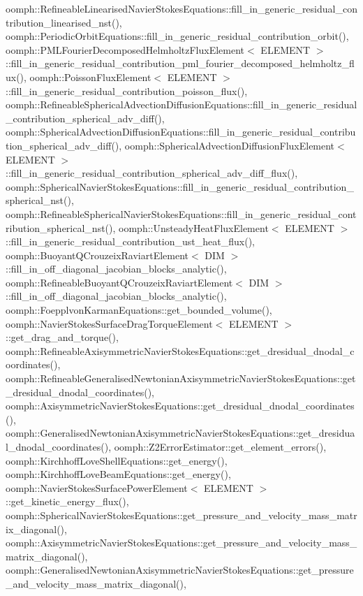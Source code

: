 oomph\+::\+Refineable\+Linearised\+Navier\+Stokes\+Equations\+::fill\+\_\+in\+\_\+generic\+\_\+residual\+\_\+contribution\+\_\+linearised\+\_\+nst(), oomph\+::\+Periodic\+Orbit\+Equations\+::fill\+\_\+in\+\_\+generic\+\_\+residual\+\_\+contribution\+\_\+orbit(), oomph\+::\+P\+M\+L\+Fourier\+Decomposed\+Helmholtz\+Flux\+Element$<$ E\+L\+E\+M\+E\+N\+T $>$\+::fill\+\_\+in\+\_\+generic\+\_\+residual\+\_\+contribution\+\_\+pml\+\_\+fourier\+\_\+decomposed\+\_\+helmholtz\+\_\+flux(), oomph\+::\+Poisson\+Flux\+Element$<$ E\+L\+E\+M\+E\+N\+T $>$\+::fill\+\_\+in\+\_\+generic\+\_\+residual\+\_\+contribution\+\_\+poisson\+\_\+flux(), oomph\+::\+Refineable\+Spherical\+Advection\+Diffusion\+Equations\+::fill\+\_\+in\+\_\+generic\+\_\+residual\+\_\+contribution\+\_\+spherical\+\_\+adv\+\_\+diff(), oomph\+::\+Spherical\+Advection\+Diffusion\+Equations\+::fill\+\_\+in\+\_\+generic\+\_\+residual\+\_\+contribution\+\_\+spherical\+\_\+adv\+\_\+diff(), oomph\+::\+Spherical\+Advection\+Diffusion\+Flux\+Element$<$ E\+L\+E\+M\+E\+N\+T $>$\+::fill\+\_\+in\+\_\+generic\+\_\+residual\+\_\+contribution\+\_\+spherical\+\_\+adv\+\_\+diff\+\_\+flux(), oomph\+::\+Spherical\+Navier\+Stokes\+Equations\+::fill\+\_\+in\+\_\+generic\+\_\+residual\+\_\+contribution\+\_\+spherical\+\_\+nst(), oomph\+::\+Refineable\+Spherical\+Navier\+Stokes\+Equations\+::fill\+\_\+in\+\_\+generic\+\_\+residual\+\_\+contribution\+\_\+spherical\+\_\+nst(), oomph\+::\+Unsteady\+Heat\+Flux\+Element$<$ E\+L\+E\+M\+E\+N\+T $>$\+::fill\+\_\+in\+\_\+generic\+\_\+residual\+\_\+contribution\+\_\+ust\+\_\+heat\+\_\+flux(), oomph\+::\+Buoyant\+Q\+Crouzeix\+Raviart\+Element$<$ D\+I\+M $>$\+::fill\+\_\+in\+\_\+off\+\_\+diagonal\+\_\+jacobian\+\_\+blocks\+\_\+analytic(), oomph\+::\+Refineable\+Buoyant\+Q\+Crouzeix\+Raviart\+Element$<$ D\+I\+M $>$\+::fill\+\_\+in\+\_\+off\+\_\+diagonal\+\_\+jacobian\+\_\+blocks\+\_\+analytic(), oomph\+::\+Foepplvon\+Karman\+Equations\+::get\+\_\+bounded\+\_\+volume(), oomph\+::\+Navier\+Stokes\+Surface\+Drag\+Torque\+Element$<$ E\+L\+E\+M\+E\+N\+T $>$\+::get\+\_\+drag\+\_\+and\+\_\+torque(), oomph\+::\+Refineable\+Axisymmetric\+Navier\+Stokes\+Equations\+::get\+\_\+dresidual\+\_\+dnodal\+\_\+coordinates(), oomph\+::\+Refineable\+Generalised\+Newtonian\+Axisymmetric\+Navier\+Stokes\+Equations\+::get\+\_\+dresidual\+\_\+dnodal\+\_\+coordinates(), oomph\+::\+Axisymmetric\+Navier\+Stokes\+Equations\+::get\+\_\+dresidual\+\_\+dnodal\+\_\+coordinates(), oomph\+::\+Generalised\+Newtonian\+Axisymmetric\+Navier\+Stokes\+Equations\+::get\+\_\+dresidual\+\_\+dnodal\+\_\+coordinates(), oomph\+::\+Z2\+Error\+Estimator\+::get\+\_\+element\+\_\+errors(), oomph\+::\+Kirchhoff\+Love\+Shell\+Equations\+::get\+\_\+energy(), oomph\+::\+Kirchhoff\+Love\+Beam\+Equations\+::get\+\_\+energy(), oomph\+::\+Navier\+Stokes\+Surface\+Power\+Element$<$ E\+L\+E\+M\+E\+N\+T $>$\+::get\+\_\+kinetic\+\_\+energy\+\_\+flux(), oomph\+::\+Spherical\+Navier\+Stokes\+Equations\+::get\+\_\+pressure\+\_\+and\+\_\+velocity\+\_\+mass\+\_\+matrix\+\_\+diagonal(), oomph\+::\+Axisymmetric\+Navier\+Stokes\+Equations\+::get\+\_\+pressure\+\_\+and\+\_\+velocity\+\_\+mass\+\_\+matrix\+\_\+diagonal(), oomph\+::\+Generalised\+Newtonian\+Axisymmetric\+Navier\+Stokes\+Equations\+::get\+\_\+pressure\+\_\+and\+\_\+velocity\+\_\+mass\+\_\+matrix\+\_\+diagonal(), 